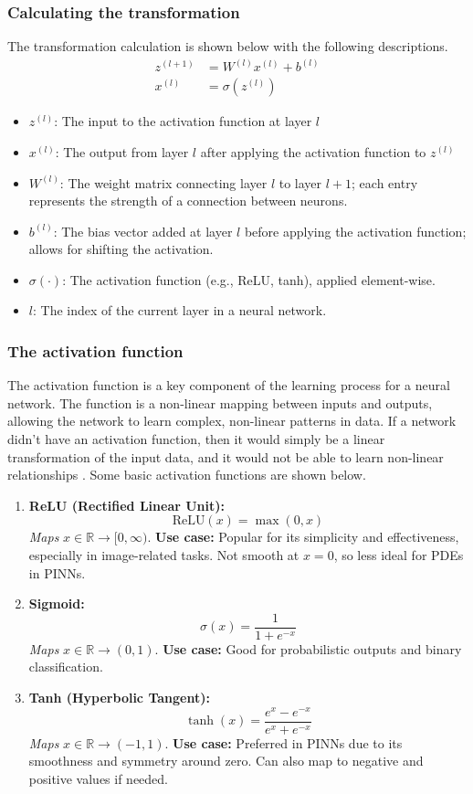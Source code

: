 \documentclass[12pt, reqno]{amsart}
\begin{document}
\subsubsection{Calculating the transformation}
The transformation calculation is shown below with the following descriptions.
\begin{align*}
z^{(l+1)} &= W^{(l)} x^{(l)} + b^{(l)} \\
x^{(l)} &= \sigma\left(z^{(l)}\right)
\end{align*}
\begin{itemize}
    \item \( z^{(l)} \): The input to the activation function at layer \( l \)
    \item \( x^{(l)} \): The output from layer \( l \) after applying the activation function to \( z^{(l)} \)
    \item \( W^{(l)} \): The weight matrix connecting layer \( l \) to layer \( l+1 \); each entry represents the strength of a connection between neurons.
    \item \( b^{(l)} \): The bias vector added at layer \( l \) before applying the activation function; allows for shifting the activation.
    \item \( \sigma(\cdot) \): The activation function (e.g., ReLU, tanh), applied element-wise.
    \item \( l \): The index of the current layer in a neural network.
\end{itemize}
\subsubsection{The activation function}
The activation function is a key component of the learning process for a neural network. The function is a non-linear mapping between inputs and outputs, allowing the network to learn complex, non-linear patterns in data. If a network didn't have an activation function, then it would simply be a linear transformation of the input data, and it would not be able to learn non-linear relationships \cite{4}. Some basic activation functions are shown below.
\begin{enumerate}
    \item \textbf{ReLU (Rectified Linear Unit):}
    \[
    \text{ReLU}(x) = \max(0, x)
    \]
    \textit{Maps} \( x \in \mathbb{R} \rightarrow [0, \infty) \).  
    \textbf{Use case:} Popular for its simplicity and effectiveness, especially in image-related tasks. Not smooth at \( x = 0 \), so less ideal for PDEs in PINNs.

    \item \textbf{Sigmoid:}
    \[
    \sigma(x) = \frac{1}{1 + e^{-x}}
    \]
    \textit{Maps} \( x \in \mathbb{R} \rightarrow (0, 1) \).  
    \textbf{Use case:} Good for probabilistic outputs and binary classification.

    \item \textbf{Tanh (Hyperbolic Tangent):}
    \[
    \tanh(x) = \frac{e^x - e^{-x}}{e^x + e^{-x}}
    \]
    \textit{Maps} \( x \in \mathbb{R} \rightarrow (-1, 1) \).  
    \textbf{Use case:} Preferred in PINNs due to its smoothness and symmetry around zero. Can also map to negative and positive values if needed.
\end{enumerate}
\end{document}
